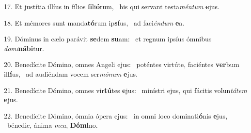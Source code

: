 17. Et justítia illíus in fílios \textbf{fi}li\textbf{ó}rum, \ast\  his qui servant testa\textit{mén}\textit{tum} \textbf{e}jus.\

18. Et mémores sunt manda\textbf{tó}rum ip\textbf{sí}us, \ast\  ad faci\textit{én}\textit{dum} \textbf{e}a.\

19. Dóminus in cælo parávit \textbf{se}dem \textbf{su}am: \ast\  et regnum ipsíus ómnibus \textit{do}\textit{mi}\textbf{ná}\textbf{bi}tur.\

20. Benedícite Dómino, omnes Angeli ejus: \dag\  poténtes virtúte, faciéntes \textbf{ver}bum il\textbf{lí}us, \ast\  ad audiéndam vocem ser\textit{mó}\textit{num} \textbf{e}jus.\

21. Benedícite Dómino, omnes vir\textbf{tú}tes \textbf{e}jus: \ast\  minístri ejus, qui fácitis volun\textit{tá}\textit{tem} \textbf{e}jus.\

22. Benedícite Dómino, ómnia ópera ejus: \dag\  in omni loco dominati\textbf{ó}nis \textbf{e}jus, \ast\  bénedic, ánima \textit{me}\textit{a}, \textbf{Dó}\textbf{mi}no.\

